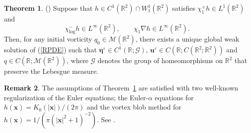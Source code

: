\documentclass{article}
\theoremstyle{definition}
\newtheorem{theorem}{Theorem}[section]
\newtheorem{remark}[theorem]{Remark}
\begin{document}
\begin{theorem} (\textbf{\cite{G.3}})
Suppose that $h \in C^1(\mathbb{R}^2) \cap W^1_1(\mathbb{R}^2)$ satisfies $\chi_1^{+} h \in L^1(\mathbb{R}^2)$ and
\begin{equation}
\chi_{\log}^{-} h \in L^\infty(\mathbb{R}^2), \qquad  \chi_1 \nabla h \in L^\infty(\mathbb{R}^2). \label{h-asympt}
\end{equation}
Then, for any initial vorticity $q_0 \in \mathcal{M}(\mathbb{R}^2)$, there exists a unique global weak solution of (\ref{RPDE}) such that 
${\bm \eta}^\varepsilon \in C^1(\mathbb{R};\mathscr{G})$, ${\bm u}^\varepsilon \in C(\mathbb{R}; C (\mathbb{R}^2; \mathbb{R}^2))$ and $q \in C(\mathbb{R};\mathcal{M}(\mathbb{R}^2))$,
where $\mathscr{G}$ denotes the group of homeomorphisms on $\mathbb{R}^2$ that preserve the Lebesgue measure. \label{well-posed}
\end{theorem}


\begin{remark}
The assumptions of Theorem~\ref{well-posed} are satisfied with two well-known regularization of the Euler equations;  the Euler-$\alpha$ equations
for $h({\bm x})=K_0(\vert{\bm x}\vert)/(2\pi)$ and the vortex blob method for $h({\bm x})=1/(\pi(\vert{\bm x}\vert^2+1)^{-2})$. See \cite{G.3, Holm(c)}.
\end{remark}


\end{document}
